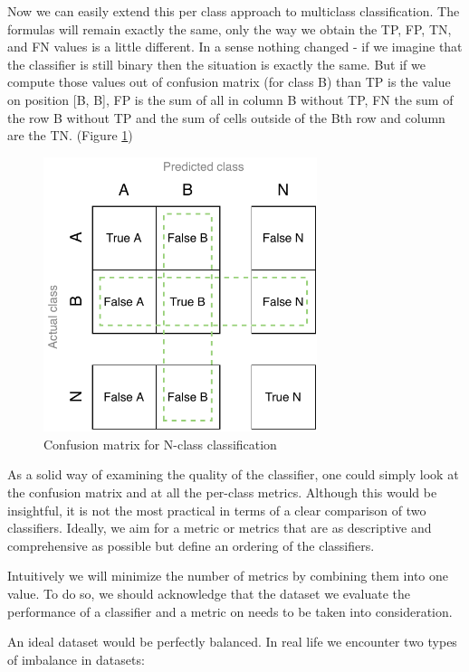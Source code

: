 Now we can easily extend this per class approach to multiclass classification. The formulas will remain exactly the same, only the way we obtain the TP, FP, TN, and FN values is a little different. In a sense nothing changed - if we imagine that the classifier is still binary then the situation is exactly the same. But if we compute those values out of confusion matrix (for class B) than TP is the value on position [B, B], FP is the sum of all in column B without TP, FN the sum of the row B without TP and the sum of cells outside of the Bth row and column are the TN. (Figure \ref{obr:BigCM})



\begin{figure}[h]\centering
\includegraphics[width=80mm]{./img//Diplomka diagramy-Big Confusion matric}
\caption{Confusion matrix for N-class classification}
\label{obr:BigCM}
\end{figure}






As a solid way of examining the quality of the classifier, one could simply look at the confusion matrix and at all the per-class metrics. Although this would be insightful, it is not the most practical in terms of a clear comparison of two classifiers. Ideally, we aim for a metric or metrics that are as descriptive and comprehensive as possible but define an ordering of the classifiers.

Intuitively we will minimize the number of metrics by combining them into one value. To do so, we should acknowledge that the dataset we evaluate the performance of a classifier and a metric on needs to be taken into consideration.

An ideal dataset would be perfectly balanced. In real life we encounter two types of imbalance in datasets:

